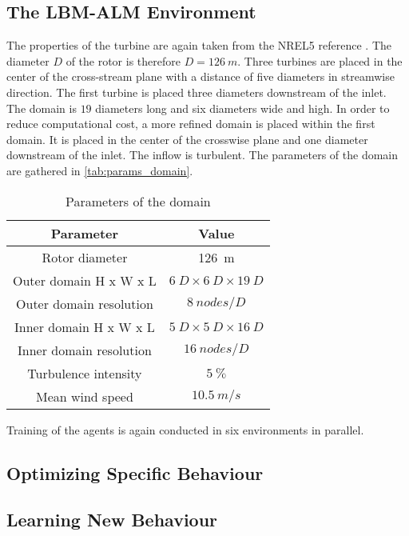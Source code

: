 \subsection{The LBM-ALM Environment}
\label{ssec:LBM_ALM_env}
The properties of the turbine are again taken from the NREL5 reference \cite{jonkman_definition_2009}. The diameter $D$ of the rotor is therefore $D=\SI{126}{m}$. Three turbines are placed in the center of the cross-stream plane with a distance of five diameters in streamwise direction. The first turbine is placed three diameters downstream of the inlet. The domain is $19$ diameters long and six diameters wide and high. In order to reduce computational cost, a more refined domain is placed within the first domain. It is placed in the center of the crosswise plane and one diameter downstream of the inlet. The inflow is turbulent. The parameters of the domain are gathered in \autoref{tab:params_domain}. \\ 
\begin{table}[h]
	\centering
	\caption{Parameters of the domain}
	\begin{tabular}{|c|c|}
	\hline
	Parameter & Value \\ \hline \hline
	Rotor diameter & \SI{126}{m} \\ \hline
	Outer domain H x W x L & $\SI{6}{D} \times \SI{6}{D} \times \SI{19}{D}$ \\ \hline
	Outer domain resolution & $\SI{8}{nodes/D}$ \\ \hline
	Inner domain H x W x L & $\SI{5}{D} \times \SI{5}{D} \times \SI{16}{D}$ \\ \hline
	Inner domain resolution & $\SI{16}{nodes/D}$ \\ \hline
	Turbulence intensity & $\SI{5}{\percent} $ \\ \hline
	Mean wind speed & $\SI{10.5}{m/s} $ \\ \hline
	\end{tabular}
	\label{tab:params_domain}
\end{table}
Training of the agents is again conducted in six environments in parallel. 
\subsection{Optimizing Specific Behaviour}

\subsection{Learning New Behaviour}

